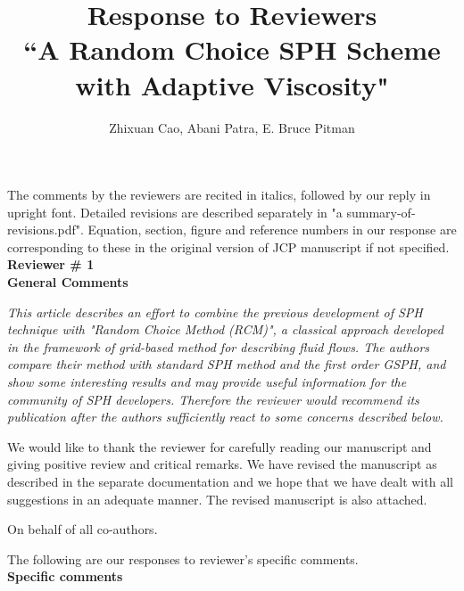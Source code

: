 \documentclass[10pt,a4paper]{article}
\begin{document}
\author{\Large {Zhixuan Cao, Abani Patra, E. Bruce Pitman}}

\title{
\LARGE \textbf{Response to Reviewers} \\
\Large \textbf{``A Random Choice SPH Scheme with Adaptive Viscosity"}}

\date{\vspace{-5ex}}

\maketitle
The comments by the reviewers are recited in italics, followed by our reply in upright font. Detailed revisions are described separately in "a summary-of-revisions.pdf". Equation, section, figure and reference numbers in our response are corresponding to these in the original 
version of JCP manuscript if not specified. \\[12pt]

\textbf{\Large Reviewer \# 1}\\[3pt]

\textbf{\large General Comments}

\textit{This article describes an effort to combine the previous development of SPH technique with "Random Choice Method (RCM)", a classical approach developed in the framework of grid-based method for
describing fluid flows. The authors compare their method with standard SPH method and the first order GSPH, and show some interesting results and may provide useful information for the community of SPH developers. Therefore the reviewer would recommend its publication after the authors sufficiently react to some concerns described below.} 

We would like to thank the reviewer for carefully reading our manuscript and giving positive review and critical remarks.
We have revised the manuscript as described in the separate documentation and we hope that we have dealt with all suggestions in an adequate manner. The revised manuscript is also attached.
 
On behalf of all co-authors.

The following are our responses to reviewer's specific comments.\\[12pt]

\textbf{\large Specific comments}
\end{document}
